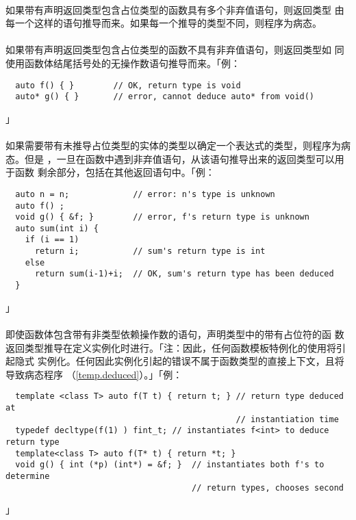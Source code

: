 \paragraph{}
如果带有声明返回类型包含占位类型的函数具有多个非弃值语句，则返回类型
由每一个这样的语句推导而来。如果每一个推导的类型不同，则程序为病态。

\paragraph{}
如果带有声明返回类型包含占位类型的函数不具有非弃值语句，则返回类型如
同使用函数体结尾括号处的无操作数语句推导而来。「例：
\begin{lstlisting}
  auto f() { }        // OK, return type is void
  auto* g() { }       // error, cannot deduce auto* from void()
\end{lstlisting}」

\paragraph{}
如果需要带有未推导占位类型的实体的类型以确定一个表达式的类型，则程序为病态。但是
，一旦在函数中遇到非弃值语句，从该语句推导出来的返回类型可以用于函数
剩余部分，包括在其他返回语句中。「例：
\begin{lstlisting}
  auto n = n;             // error: n's type is unknown
  auto f() ;
  void g() { &f; }        // error, f's return type is unknown
  auto sum(int i) {
    if (i == 1)
      return i;           // sum's return type is int
    else
      return sum(i-1)+i;  // OK, sum's return type has been deduced
  }
\end{lstlisting}」

\paragraph{}
即使函数体包含带有非类型依赖操作数的语句，声明类型中的带有占位符的函
数返回类型推导在定义实例化时进行。「注：因此，任何函数模板特例化的使用将引起隐式
实例化。任何因此实例化引起的错误不属于函数类型的直接上下文，且将导致病态程序
（\ref{temp.deduced}）。」「例：
\begin{lstlisting}
  template <class T> auto f(T t) { return t; } // return type deduced at
                                               // instantiation time
  typedef decltype(f(1) ) fint_t; // instantiates f<int> to deduce return type
  template<class T> auto f(T* t) { return *t; }
  void g() { int (*p) (int*) = &f; }  // instantiates both f's to determine
                                      // return types, chooses second
\end{lstlisting}」

